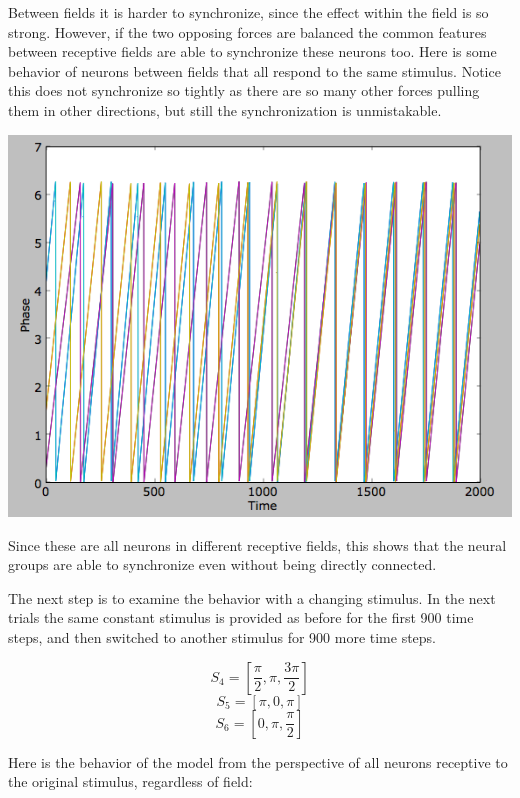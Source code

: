 \documentclass[12pt]{article}
\begin{document}
Between fields it is harder to synchronize, since the effect within the field is so strong.  However, if the two opposing forces are balanced the common features between receptive fields are able to synchronize these neurons too.  Here is some behavior of neurons between fields that all respond to the same stimulus.  Notice this does not synchronize so tightly as there are so many other forces pulling them in other directions, but still the synchronization is unmistakable.  

\vspace{10pt}
\includegraphics[scale=0.6]{betweenfields.png}

Since these are all neurons in different receptive fields, this shows that the neural groups are able to synchronize even without being directly connected.  

The next step is to examine the behavior with a changing stimulus.  In the next trials the same constant stimulus is provided as before for the first 900 time steps, and then switched to another stimulus for 900 more time steps.  

$$ S_4=[\frac{\pi}{2},\pi,\frac{3\pi}{2}] $$
$$ S_5=[\pi,0,\pi] $$
$$ S_6=[0,\pi,\frac{\pi}{2}] $$

Here is the behavior of the model from the perspective of all neurons receptive to the original stimulus, regardless of field:
\end{document}
